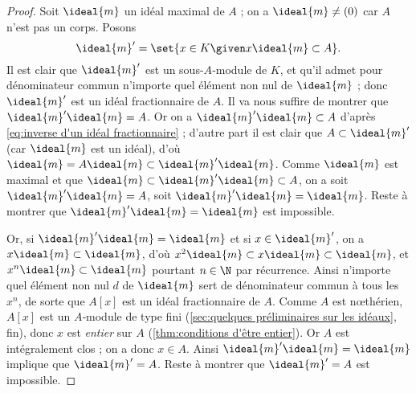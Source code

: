 \documentclass[11pt, %
  title in boldface,
  theorem in new line,
  theorem numbering = section,
  number theorems separately,
  simple name,
]{beaulivre}
\begin{document}
    \begin{proof}
        Soit \( \ideal{m} \) un idéal maximal de \( A \) ; on a \( \ideal{m} \neq (0) \) car \( A \) n'est pas un corps. Posons
        \begin{equation}\label{eq:inverse d'un idéal fractionnaire}
            \ideal{m}' = \set{ x \in K \given x\ideal{m} \subset A }.
        \end{equation}
        Il est clair que \( \ideal{m}' \) est un sous-\( A \)‑module de \( K \), et qu'il admet pour dénominateur commun n'importe quel élément non nul de \( \ideal{m} \) ; donc \( \ideal{m}' \) est un idéal fractionnaire de \( A \). Il va nous suffire de montrer que \( \ideal{m}'\ideal{m} = A \). Or on a \( \ideal{m}'\ideal{m} \subset A \) d'après \eqref{eq:inverse d'un idéal fractionnaire} ; d'autre part il est clair que \( A \subset \ideal{m}' \) (car \( \ideal{m} \) est un idéal), d'où \( \ideal{m} = A \ideal{m} \subset \ideal{m}'\ideal{m} \). Comme \( \ideal{m} \) est maximal et que \( \ideal{m} \subset \ideal{m}'\ideal{m} \subset A \), on a soit \( \ideal{m}'\ideal{m} = A \), soit \( \ideal{m}'\ideal{m} = \ideal{m} \). Reste à montrer que \( \ideal{m}'\ideal{m} = \ideal{m} \) est impossible.

        Or, si \( \ideal{m}'\ideal{m} = \ideal{m} \) et si \( x \in \ideal{m}' \), on a \( x \ideal{m} \subset \ideal{m} \), d'où \( x^2 \ideal{m} \subset x \ideal{m} \subset \ideal{m} \), et \( x^n \ideal{m} \subset \ideal{m} \) pourtant \( n \in \N \) par récurrence. Ainsi n'importe quel élément non nul \( d \) de \( \ideal{m} \) sert de dénominateur commun à tous les \( x^n \), de sorte que \( A[x] \) est un idéal fractionnaire de \( A \). Comme \( A \) est nœthérien, \( A[x] \) est un \( A \)‑module de type fini (\cref{sec:quelques préliminaires sur les idéaux}, fin), donc \( x \) est \emph{entier} sur \( A \) (\cref{thm:conditions d'être entier}). Or \( A \) est intégralement clos ; on a donc \( x \in A \). Ainsi \( \ideal{m}'\ideal{m} = \ideal{m} \) implique que \( \ideal{m}' = A \). Reste à montrer que \( \ideal{m}' = A \) est impossible.


\end{proof}
\end{document}
